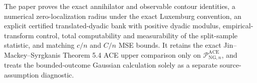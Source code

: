 The paper proves the exact annihilator and observable contour identities, a numerical zero-localization radius under the exact Luxemburg convention, an explicit certified translated-dyadic bank with positive dyadic modulus, empirical-transform control, total computability and measurability of the split-sample statistic, and matching \(c/n\) and \(C/n\) MSE bounds.  It retains the exact Jin--Mackey--Syrgkanis Theorem 5.4 ACE upper comparison only on \(\mathcal P_{\mathrm{NG},n}^{\mathrm{ACE}}\), and treats the bounded-outcome Gaussian calculation solely as a separate source-assumption diagnostic.